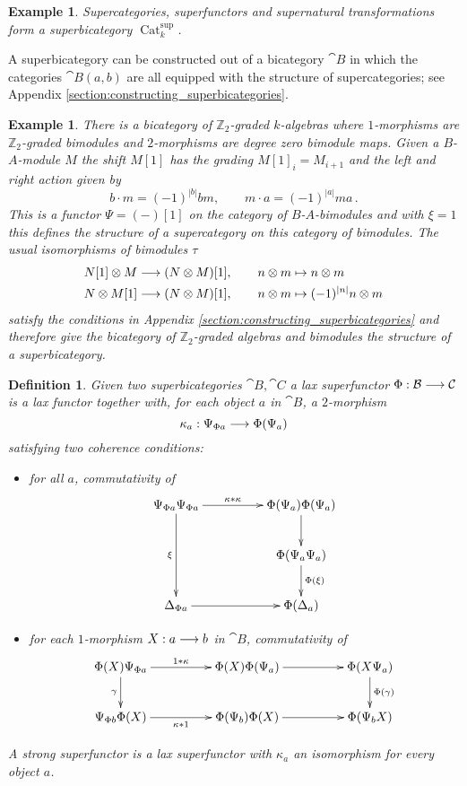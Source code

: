 \documentclass[english,letter paper,12pt,leqno]{article}
\theoremstyle{example}
\newtheorem{definition}[theorem]{Definition}
\newtheorem{example}[theorem]{Example}
\numberwithin{equation}{section}
\DeclareMathOperator{\Cat}{Cat}
\begin{document}
\begin{example} Supercategories, superfunctors and supernatural transformations form a superbicategory $\Cat^{\operatorname{sup}}_k$.
\end{example}

A superbicategory can be constructed out of a bicategory $\cat{B}$ in which the categories $\cat{B}(a,b)$ are all equipped with the structure of supercategories; see Appendix \ref{section:constructing_superbicategories}.

\begin{example}\label{example:bicategory_m} There is a bicategory of $\mathbb{Z}_2$-graded $k$-algebras where $1$-morphisms are $\mathbb{Z}_2$-graded bimodules and $2$-morphisms are degree zero bimodule maps. Given a $B$-$A$-module $M$ the shift $M[1]$ has the grading $M[1]_i = M_{i+1}$ and the left and right action given by
\[
b \cdot m = (-1)^{|b|} bm, \qquad m \cdot a = (-1)^{|a|} m a\,.
\]
This is a functor $\Psi = (-)[1]$ on the category of $B$-$A$-bimodules and with $\xi = 1$ this defines the structure of a supercategory on this category of bimodules. The usual isomorphisms of bimodules $\tau$
\begin{align}
N[1] \otimes M &\longrightarrow (N \otimes M)[1], \qquad n \otimes m \mapsto n \otimes m \label{eq:shift_iso_a}\\
N \otimes M[1] &\longrightarrow (N \otimes M)[1], \qquad n \otimes m \mapsto (-1)^{|n|} n \otimes m\label{eq:shift_iso_b}
\end{align}
satisfy the conditions in Appendix \ref{section:constructing_superbicategories} and therefore give the bicategory of $\mathbb{Z}_2$-graded algebras and bimodules the structure of a superbicategory.
\end{example}

\begin{definition} Given two superbicategories $\cat{B}, \cat{C}$ a \emph{lax superfunctor} $\Phi: \mathcal{B} \longrightarrow \mathcal{C}$ is a lax functor together with, for each object $a$ in $\cat{B}$, a $2$-morphism
\[
\kappa_a: \Psi_{\Phi a} \longrightarrow \Phi( \Psi_a )
\]
satisfying two coherence conditions:
\begin{itemize}
\item[(a)] for all $a$, commutativity of
\[
\xymatrix@C+2pc{
\Psi_{\Phi a} \Psi_{\Phi a} \ar[dd]_-{\xi}\ar[r]^-{\kappa * \kappa} & \Phi( \Psi_a ) \Phi( \Psi_a ) \ar[d]\\
& \Phi( \Psi_a \Psi_a ) \ar[d]^-{\Phi(\xi)}\\
\Delta_{\Phi a} \ar[r] & \Phi( \Delta_a )
}
\]
\item[(b)] for each $1$-morphism $X: a \longrightarrow b$ in $\cat{B}$, commutativity of
\[
\xymatrix@C+2pc{
\Phi(X) \Psi_{\Phi a} \ar[d]_-{\gamma} \ar[r]^-{1 * \kappa} & \Phi(X) \Phi(\Psi_a) \ar[r] & \Phi( X \Psi_a ) \ar[d]^-{\Phi(\gamma)}\\
\Psi_{\Phi b} \Phi(X) \ar[r]_-{\kappa * 1} & \Phi(\Psi_b) \Phi(X) \ar[r] & \Phi( \Psi_b X)
}
\]
\end{itemize}
A \emph{strong superfunctor} is a lax superfunctor with $\kappa_a$ an isomorphism for every object $a$.
\end{definition}
\end{document}
